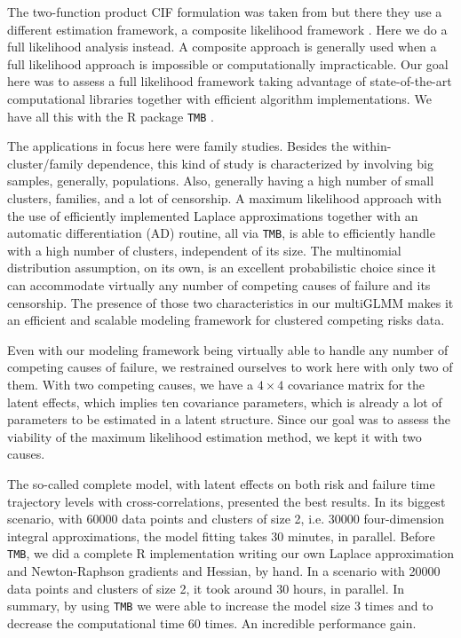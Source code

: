 \documentclass[a4paper,12pt]{article}
\begin{document}
The two-function product CIF formulation was taken from \cite{SCHEIKE}
but there they use a different estimation framework, a composite
likelihood framework \citep{lindsay88,cox&reid04,varin11}. Here we do a
full likelihood analysis instead. A composite approach is generally used
when a full likelihood approach is impossible or computationally
impracticable. Our goal here was to assess a full likelihood framework
taking advantage of state-of-the-art computational libraries together
with efficient algorithm implementations. We have all this with the R
\citep{R21} package \texttt{TMB} \citep{TMB}.

The applications in focus here were family studies. Besides the
within-cluster/family dependence, this kind of study is characterized by
involving big samples, generally, populations. Also, generally having a
high number of small clusters, families, and a lot of censorship. A
maximum likelihood approach with the use of efficiently implemented
Laplace approximations \citep{tierney,patrao} together with an automatic
differentiation (AD) \citep{corestats,nocedal&wright} routine, all via
\texttt{TMB}, is able to efficiently handle with a high number of
clusters, independent of its size. The multinomial distribution
assumption, on its own, is an excellent probabilistic choice since it
can accommodate virtually any number of competing causes of failure and
its censorship. The presence of those two characteristics in our
multiGLMM makes it an efficient and scalable modeling framework for
clustered competing risks data.

Even with our modeling framework being virtually able to handle any
number of competing causes of failure, we restrained ourselves to work
here with only two of them. With two competing causes, we have
a \(4\times4\) covariance matrix for the latent effects, which implies
ten covariance parameters, which is already a lot of parameters to be
estimated in a latent structure. Since our goal was to assess the
viability of the maximum likelihood estimation method, we kept it with
two causes.

The so-called complete model, with latent effects on both risk and
failure time trajectory levels with cross-correlations, presented the
best results. In its biggest scenario, with 60000 data points and
clusters of size 2, i.e. 30000 four-dimension integral approximations,
the model fitting takes 30 minutes, in parallel. Before \texttt{TMB}, we
did a complete R implementation writing our own Laplace approximation
\citep{patrao} and Newton-Raphson gradients and Hessian, by hand. In a
scenario with 20000 data points and clusters of size 2, it took around
30 hours, in parallel. In summary, by using \texttt{TMB} we were able to
increase the model size 3 times and to decrease the computational time
60 times. An incredible performance gain.
\end{document}

